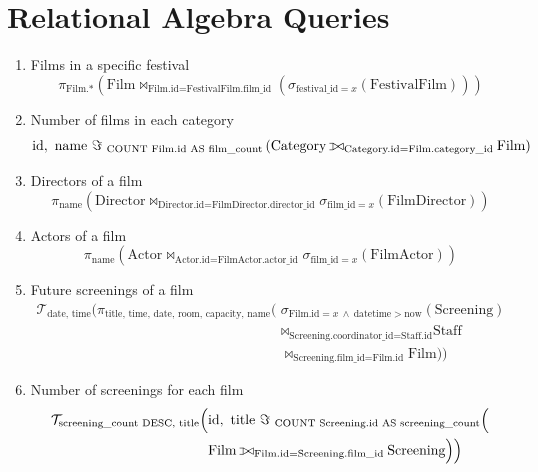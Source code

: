 \documentclass[12pt]{article}
\def\ojoin{%
  \rule[-.02ex]{.25em}{.4pt}\llap{\rule[.45em]{.25em}{.4pt}}}
\def\leftouterjoin{\mathbin{\ojoin\mkern-5.8mu\bowtie}}
\begin{document}
\newpage

\section{Relational Algebra Queries}

\begin{enumerate}

\item Films in a specific festival
$$
\pi_{\text{Film.*}}
\left(
  \text{Film} 
  \Join_{\text{Film.id} = 
  \text{FestivalFilm.film\_id}}
  \left(
    \sigma_{\text{festival\_id} = x}
    (\text{FestivalFilm})
  \right)
\right)
$$

\item Number of films in each category
$$
\text{id},\ \text{name}\ \Im_{\ \text{COUNT Film.id 
AS film\_count}}
\left(
  \text{Category} 
  \leftouterjoin_{\text{Category.id} = 
  \text{Film.category\_id}} \text{Film}
\right)
$$

\item Directors of a film
$$
\pi_{\text{name}}
\left(
  \text{Director} 
  \Join_{\text{Director.id} = 
  \text{FilmDirector.director\_id}}
  \sigma_{\text{film\_id} = x}
  (\text{FilmDirector})
\right)
$$

\item Actors of a film
$$
\pi_{\text{name}}
\left(
  \text{Actor} 
  \Join_{\text{Actor.id} = 
  \text{FilmActor.actor\_id}}
  \sigma_{\text{film\_id} = x}
  (\text{FilmActor})
\right)
$$

\item Future screenings of a film
$$
\begin{aligned}
  \mathcal{T}_{\text{date, time}}
  \Big(
    \pi_{\text{title, time, date, room, capacity, name}}
    \Big(
      &\sigma_{\text{Film.id} = x\ 
      \land\ 
      \text{datetime} > 
      \text{now}}
      (\text{Screening})\\
      &\Join_{\text{Screening.coordinator\_id} = 
      \text{Staff.id}}
      \text{Staff}\\
      &\Join_{\text{Screening.film\_id} = 
      \text{Film.id}}
      \text{Film}
    \Big)
  \Big)
\end{aligned}
$$

\item Number of screenings for each film
$$
\begin{aligned}
  \mathcal{T}_{\text{screening\_count DESC, title}}
  \Big(
    &\text{id},\ \text{title}\ 
    \Im_{\ \text{COUNT Screening.id 
    AS screening\_count}}
    \Big(\\
      &\text{Film} 
      \leftouterjoin_{\text{Film.id} = 
      \text{Screening.film\_id}} 
      \text{Screening}
    \Big)
  \Big)
\end{aligned}
$$


\end{enumerate}
\end{document}
